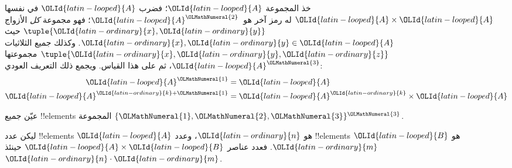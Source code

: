 \documentclass[../../../include/open-logic-section]{subfiles}
\begin{document}
\begin{ex}
خذ المجموعة ${\OLId{latin-looped}{A}}$؛ فضرب ${\OLId{latin-looped}{A}}$ في نفسها ${\OLId{latin-looped}{A}} \times {\OLId{latin-looped}{A}}$ له رمز آخر هو~${\OLId{latin-looped}{A}}^{\OLMathNumeral{2}}$؛
فهو مجموعة \emph{كل} الأزواج $\tuple{{\OLId{latin-ordinary}{x}}, {\OLId{latin-ordinary}{y}}}$ حيث ${\OLId{latin-ordinary}{x}}, {\OLId{latin-ordinary}{y}} \in {\OLId{latin-looped}{A}}$.
وكذلك جميع الثلاثيات $\tuple{{\OLId{latin-ordinary}{x}}, {\OLId{latin-ordinary}{y}}, {\OLId{latin-ordinary}{z}}}$ مجموعتها ${\OLId{latin-looped}{A}}^{\OLMathNumeral{3}}$، ثم على هذا
القياس. ويجمع ذلك التعريف العودي:
\begin{align*}
  {\OLId{latin-looped}{A}}^{\OLMathNumeral{1}} & = {\OLId{latin-looped}{A}}\\
  {\OLId{latin-looped}{A}}^{{\OLId{latin-ordinary}{k}}+{\OLMathNumeral{1}}} & = {\OLId{latin-looped}{A}}^{\OLId{latin-ordinary}{k}} \times {\OLId{latin-looped}{A}}
\end{align*}
\end{ex}

\begin{prob}
عيّن جميع !!{element}s المجموعة $\{{\OLMathNumeral{1}}, {\OLMathNumeral{2}}, {\OLMathNumeral{3}}\}^{\OLMathNumeral{3}}$.
\end{prob}

\begin{prop}
ليكن عدد !!{element}s ${\OLId{latin-looped}{A}}$ هو ${\OLId{latin-ordinary}{n}}$، وعدد !!{element}s ${\OLId{latin-looped}{B}}$ هو ${\OLId{latin-ordinary}{m}}$.
فعدد عناصر ${\OLId{latin-looped}{A}} \times {\OLId{latin-looped}{B}}$ حينئذ ${\OLId{latin-ordinary}{n}}\cdot {\OLId{latin-ordinary}{m}}$.
\end{prop}
\end{document}
